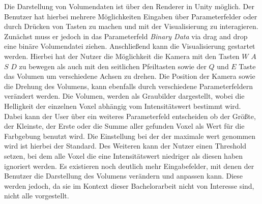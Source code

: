 Die Darstellung von Volumendaten ist über den Renderer in Unity möglich. Der Benutzer hat hierbei mehrere Möglichkeiten Eingaben über Parameterfelder oder durch Drücken von Tasten zu machen und mit der Visualisierung zu interagieren. Zunächst muss er jedoch in das Parameterfeld \textit{Binary Data} via drag and drop eine binäre Volumendatei ziehen. Anschließend kann die Visualisierung gestartet werden. Hierbei hat der Nutzer die Möglichkeit die Kamera mit den Tasten $W$ $A$ $S$ $D$ zu bewegen als auch mit den seitlichen Pfeiltasten sowie der $Q$ und $E$ Taste das Volumen um verschiedene Achsen zu drehen. Die Position der Kamera sowie die Drehung des Volumens, kann ebenfalls durch verschiedene Parameterfeldern verändert werden.
\newline
Die Volumen, werden als Graubilder dargestellt, wobei die Helligkeit der einzelnen Voxel abhängig vom Intensitätswert bestimmt wird. Dabei kann der User über ein weiteres Parameterfeld entscheiden ob der Größte, der Kleinste, der Erste oder die Summe aller gefunden Voxel als Wert für die Farbgebung benutzt wird. Die Einstellung bei der der maximale wert genommen wird ist hierbei der Standard. Des Weiteren kann der Nutzer einen Threshold setzen, bei dem alle Voxel die eine Intensitätswert niedriger als diesen haben ignoriert werden.
\newline
Es existieren noch deutlich mehr Eingabefelder, mit denen der Benutzer die Darstellung des Volumens verändern und anpassen kann. Diese werden jedoch, da sie im Kontext dieser Bachelorarbeit nicht von Interesse sind, nicht alle vorgestellt.


